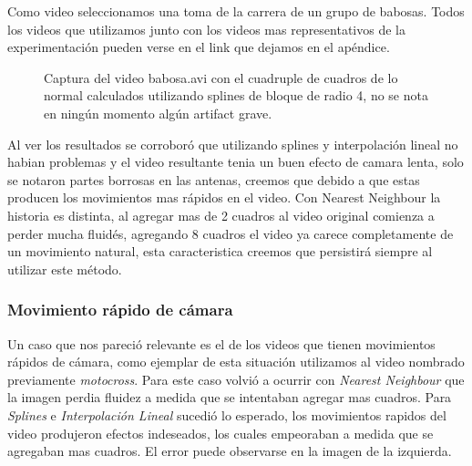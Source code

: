 Como video seleccionamos una toma de la carrera de un grupo de babosas. Todos los videos que utilizamos junto con los videos mas representativos de la experimentación pueden verse en el link que dejamos en el apéndice.

\begin{figure}[H]
\centering
\begin{minipage}{0.60\textwidth}   
\end{minipage}\hfill
\caption{\footnotesize Captura del video babosa.avi con el cuadruple de cuadros de lo normal calculados utilizando splines de bloque de radio 4, no se nota en ningún momento algún artifact grave.}
\end{figure}

Al ver los resultados se corroboró que utilizando splines y interpolación lineal no habian problemas y el video resultante tenia un buen efecto de camara lenta, solo se notaron partes borrosas en las antenas, creemos que debido a que estas producen los movimientos mas rápidos en el video. Con Nearest Neighbour la historia es distinta, al agregar mas de 2 cuadros al video original comienza a perder mucha fluidés, agregando 8 cuadros el video ya carece completamente de un movimiento natural, esta caracteristica creemos que persistirá siempre al utilizar este método.

\subsubsection{Movimiento rápido de cámara}

Un caso que nos pareció relevante es el de los videos que tienen movimientos rápidos de cámara, como ejemplar de esta situación utilizamos al video nombrado previamente \textit{motocross}. Para este caso volvió a ocurrir con \textit{Nearest Neighbour} que la imagen perdia fluidez a medida que se intentaban agregar mas cuadros. Para  \textit{Splines} e \textit{Interpolación Lineal}  sucedió lo esperado, los movimientos rapidos del video produjeron efectos indeseados, los cuales empeoraban a medida que se agregaban mas cuadros. El error puede observarse en la imagen de la izquierda.

